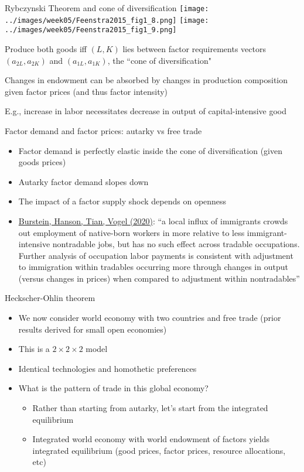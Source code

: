 \documentclass[11pt,notes=hide,aspectratio=169]{beamer}
\begin{document}
\begin{frame}{Rybczynski Theorem and cone of diversification}
\texttt{[image: ../images/week05/Feenstra2015\_fig1\_8.png]}
\texttt{[image: ../images/week05/Feenstra2015\_fig1\_9.png]}
\begin{itemize}{\footnotesize
\item Produce both goods iff $\left( L,K\right) $ lies between
factor requirements vectors $\left( a_{2L},a_{2K}\right) $ and $\left(
a_{1L},a_{1K}\right) $, the   ``cone of diversification"
\item Changes in endowment can be absorbed by changes in production composition given factor prices (and thus factor intensity)
\item E.g., increase in labor necessitates decrease in output of capital-intensive good
\par}\end{itemize}
\end{frame}
\begin{frame}{Factor demand and factor prices: autarky vs free trade}
\begin{itemize}
\item Factor demand is perfectly elastic inside the cone of diversification (given goods prices)
\item Autarky factor demand slopes down
\item The impact of a factor supply shock depends on openness
\item \href{https://doi.org/10.3982/ECTA16196}{Burstein, Hanson, Tian, Vogel (2020)}: ``a local influx of immigrants crowds out employment of native-born workers in more relative to less immigrant-intensive nontradable jobs, but has no such effect across tradable occupations. Further analysis of occupation labor payments is consistent with adjustment to immigration within tradables occurring more through changes in output (versus changes in prices) when compared to adjustment within nontradables''
\end{itemize}
\end{frame}
\begin{frame}{Heckscher-Ohlin theorem}
\begin{itemize}
	\item We now consider world economy with two countries and free trade (prior results derived for small open economies)
	\item This is a $2 \times 2 \times 2$ model
	\item Identical technologies and homothetic preferences
	\item What is the pattern of trade in this global economy?
	\begin{itemize}
		\item Rather than starting from autarky, let's start from the integrated equilibrium
		\item Integrated world economy with world endowment of factors yields integrated equilibrium (good prices, factor prices, resource allocations, etc)
	\end{itemize}
\end{itemize}
\end{frame}
\end{document}
